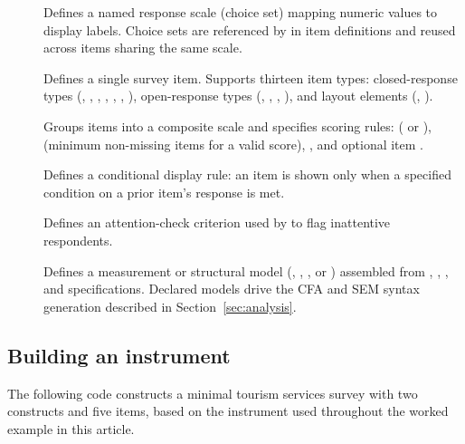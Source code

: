 \documentclass[article]{jss}\usepackage[]{graphicx}\usepackage[]{xcolor}
\begin{document}
\begin{description}
  \item[] Defines a named response scale (choice
    set) mapping numeric values to display labels. Choice sets are
    referenced by  in item definitions and reused across items
    sharing the same scale.
  \item[] Defines a single survey item. Supports
    thirteen item types: closed-response types
    (, , ,
    , , , ),
    open-response types (, ,
    , ), and layout elements
    (, ).
  \item[] Groups items into a composite scale and
    specifies scoring rules:  ( or
    ),  (minimum non-missing items for a
    valid score), , and optional item
    .
  \item[] Defines a conditional display rule: an
    item is shown only when a specified condition on a prior item's
    response is met.
  \item[] Defines an attention-check criterion used
    by  to flag inattentive respondents.
  \item[] Defines a measurement or structural model
    (, , , or )
    assembled from , ,
    , and  specifications.
    Declared models drive the CFA and SEM syntax generation described
    in Section~\ref{sec:analysis}.
\end{description}

\subsection{Building an instrument}

The following code constructs a minimal tourism services survey with
two constructs and five items, based on the instrument used throughout
the worked example in this article.
\end{document}
